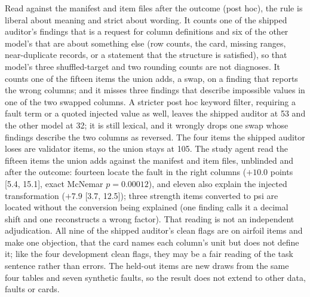 Read against the manifest and item files after the outcome (post hoc), the rule is liberal about
meaning and strict about wording. It counts one of the shipped auditor's findings that is a request for column definitions and six of the other model's that are about something else (row counts, the card, missing ranges, near-duplicate records, or a statement that the structure is satisfied), so that model's three shuffled-target and two rounding counts are not diagnoses. It counts one of the fifteen items the union adds, a swap, on a finding that
reports the wrong columns; and it misses three findings that describe impossible values in one of the
two swapped columns. A stricter post hoc keyword filter, requiring a fault term or a quoted injected value as well, leaves the shipped auditor at 53 and the other model at 32; it is still lexical, and it wrongly drops one swap whose findings describe the two columns as reversed. The four items the shipped auditor loses are validator items, so the union stays at 105. The study agent read the fifteen items the union adds against the manifest and item files, unblinded and after the outcome: fourteen locate the fault in the right columns ($+10.0$ points [5.4, 15.1], exact McNemar $p = 0.00012$), and eleven also explain the injected transformation ($+7.9$ [3.7, 12.5]); three strength items converted to psi are located without the conversion being explained (one finding calls it a decimal shift and one reconstructs a wrong factor). That reading is not an independent adjudication. All nine of the shipped auditor's clean flags
are on airfoil items and make one objection, that the card names each column's unit but does not
define it; like the four development clean flags, they may be a fair reading of the task sentence
rather than errors. The held-out items are new draws from the same four tables and seven synthetic
faults, so the result does not extend to other data, faults or cards.
